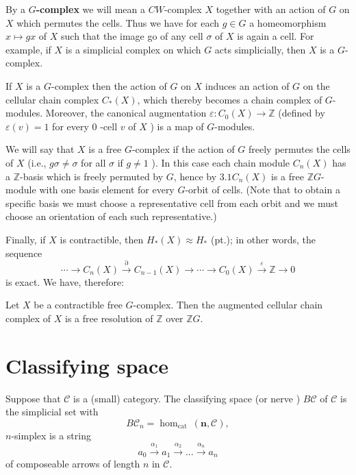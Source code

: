 By a \textbf{$G$-complex} we will mean a $C W$-complex $X$ together with an action of $G$ on $X$ which permutes the cells. Thus we have for each $g \in G$ a homeomorphism $x \mapsto g x$ of $X$ such that the image go of any cell $\sigma$ of $X$ is again a cell. For example, if $X$ is a simplicial complex on which $G$ acts simplicially, then $X$ is a $G$-complex.

If $X$ is a $G$-complex then the action of $G$ on $X$ induces an action of $G$ on the cellular chain complex $C_*(X)$, which thereby becomes a chain complex of $G$-modules. Moreover, the canonical augmentation $\varepsilon: C_0(X) \rightarrow \mathbb{Z}$ (defined by $\varepsilon(v)=1$ for every 0 -cell $v$ of $X$ ) is a map of $G$-modules.

We will say that $X$ is a free $G$-complex if the action of $G$ freely permutes the cells of $X$ (i.e., $g \sigma \neq \sigma$ for all $\sigma$ if $g \neq 1$ ). In this case each chain module $C_n(X)$ has a $\mathbb{Z}$-basis which is freely permuted by $G$, hence by $3.1 C_n(X)$ is a free $\mathbb{Z} G$-module with one basis element for every $G$-orbit of cells. (Note that to obtain a specific basis we must choose a representative cell from each orbit and we must choose an orientation of each such representative.)

Finally, if $X$ is contractible, then $H_*(X) \approx H_*$ (pt.); in other words, the sequence
$$
\cdots \rightarrow C_n(X) \stackrel{\partial}{\rightarrow} C_{n-1}(X) \rightarrow \cdots \rightarrow C_0(X) \stackrel{\varepsilon}{\rightarrow} \mathbb{Z} \rightarrow 0
$$
is exact. We have, therefore:

\begin{prop}
    
    Let $X$ be a contractible free $G$-complex. Then the augmented cellular chain complex of $X$ is a free resolution of $\mathbb{Z}$ over $\mathbb{Z} G$.
\end{prop}




\section{Classifying space}

Suppose that $\mathcal{C}$ is a (small) category. The classifying space (or nerve ) $B \mathcal{C}$ of $\mathcal{C}$ is the simplicial set with
$$
B \mathcal{C}_n=\operatorname{hom}_{\text {cat }}(\mathbf{n}, \mathcal{C}),
$$
$n$-simplex is a string
$$
a_0 \xrightarrow{\alpha_1} a_1 \xrightarrow{\alpha_2} \ldots \xrightarrow{\alpha_n} a_n
$$
of composeable arrows of length $n$ in $\mathcal{C}$.\\

